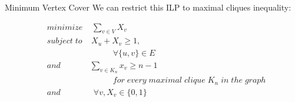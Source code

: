 \documentclass{beamer}
\begin{document}
\begin{frame}{Minimum Vertex Cover}
We can restrict this ILP to maximal cliques inequality:

 
\begin{align*}
&minimize \; \;\; \; \sum_{v\in V}X_v\\
&subject\; to \;\;\; \; X_u + X_v  \geq 1 ,\\
&\qquad 	\qquad\qquad\qquad	 \forall \{u,v\} \in E\\
&and	\qquad\quad\;\; \sum_{v\in K_n}x_v \geq n - 1\\
& \qquad\qquad \qquad\qquad for\; every\; maximal\; clique\; K_n\; in\; the\; graph\\
&and	\qquad\qquad	 \forall v, X_v\in \{0,1\}
\end{align*}
\end{frame}
\end{document}
